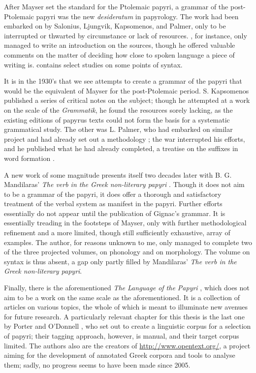 After Mayser set the standard for the Ptolemaic papyri, a grammar of
the post-Ptolemaic papyri was the new \textit{desideratum} in
papyrology. The work had been embarked on by Salonius, Ljungvik,
Kapsomenos, and Palmer, only to be interrupted or thwarted by
circumstance or lack of resources.  \cite{salonius1927}, for
instance, only managed to write an introduction on the sources, though
he offered valuable comments on the matter of deciding how close to
spoken language a piece of writing is. \cite{ljungvik1932} contains
select studies on some points of syntax.

It is in the 1930's that we see attempts to create a grammar of the
papyri that would be the equivalent of Mayser for the post-Ptolemaic
period.  S. Kapsomenos published a series of critical
notes \citep{kapsomenos1938,kapsomenos1957} on the
subject; though he attempted at a work on the scale of the
\textit{Grammatik}, he found the resources sorely lacking, as the
existing editions of papyrus texts could not form the basis for a
systematic grammatical study. The other was L. Palmer,
who had embarked on similar project and had already set out a
methodology \citep{palmer1934}; the war interrupted his efforts,
and he published what he had already completed, a treatise on the
suffixes in word formation \citep{palmer1945}.

A new work of some magnitude presents itself two decades later with
B. G.  Mandilaras' \textit{The verb in the Greek non-literary papyri}
\citep{mandilaras1973}. Though it does not aim to be a grammar of
the papyri, it does offer a thorough and satisfactory treatment of the
verbal system as manifest in the papyri.  Further efforts essentially
do not appear until the publication of Gignac's grammar. It is
essentially treading in the footsteps of Mayser, only with further
methodological refinement and a more limited, though still
sufficiently exhaustive, array of examples. The author, for reasons
unknown to me, only managed to complete two of the three projected
volumes, on phonology and on morphology. The volume on syntax is thus
absent, a gap only partly filled by Mandilaras' \textit{The verb in
  the Greek non-literary papyri}.

Finally, there is the aforementioned \textit{The Language of the
  Papyri} \citep{lpapyri}, which does not aim to be a work on the same
scale as the aforementioned. It is a collection of articles on various
topics, the whole of which is meant to illuminate new avenues for
future research. A particularly relevant chapter for this thesis is
the last one by Porter and O'Donnell \citep{porter2010}, who set out
to create a linguistic corpus for a selection of papyri; their tagging
approach, however, is manual, and their target corpus limited. The
authors also are the creators of \url{http://www.opentext.org/}, a
project aiming for the development of annotated Greek corpora and
tools to analyse them; sadly, no progress seems to have been made
since 2005.

